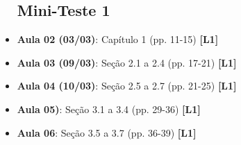 \documentclass[12pt,a4paper,oneside]{article}
\begin{document}
\begin{itemize}
	
	\subsection{Mini-Teste 1}
	
	\item[] {\bf Aula 02 (03/03)}: Capítulo 1 (pp. 11-15) {\bf \color{blue} [L1]}
	\item[] {\bf Aula 03 (09/03)}: Seção 2.1 a 2.4 (pp. 17-21) {\bf \color{blue} [L1]}
	\item[] {\bf Aula 04 (10/03)}: Seção 2.5 a 2.7 (pp. 21-25) {\bf \color{blue} [L1]}
	\item[] {\bf Aula 05)}: Seção 3.1 a 3.4 (pp. 29-36) {\bf \color{blue} [L1]}
	\item[] {\bf Aula 06}: Seção 3.5 a 3.7 (pp. 36-39) {\bf \color{blue} [L1]}
	
%	
%	
%	
%	
%	
	
\end{itemize}
\end{document}
